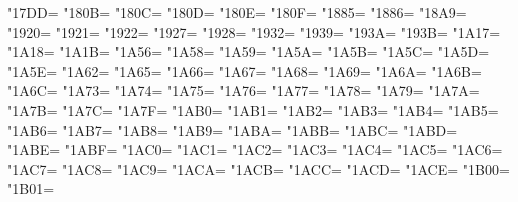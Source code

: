 \XeTeXcharclass"17DD=\KclassNum
\XeTeXcharclass"180B=\KclassNum
\XeTeXcharclass"180C=\KclassNum
\XeTeXcharclass"180D=\KclassNum
\XeTeXcharclass"180E=\KclassNum
\XeTeXcharclass"180F=\KclassNum
\XeTeXcharclass"1885=\KclassNum
\XeTeXcharclass"1886=\KclassNum
\XeTeXcharclass"18A9=\KclassNum
\XeTeXcharclass"1920=\KclassNum
\XeTeXcharclass"1921=\KclassNum
\XeTeXcharclass"1922=\KclassNum
\XeTeXcharclass"1927=\KclassNum
\XeTeXcharclass"1928=\KclassNum
\XeTeXcharclass"1932=\KclassNum
\XeTeXcharclass"1939=\KclassNum
\XeTeXcharclass"193A=\KclassNum
\XeTeXcharclass"193B=\KclassNum
\XeTeXcharclass"1A17=\KclassNum
\XeTeXcharclass"1A18=\KclassNum
\XeTeXcharclass"1A1B=\KclassNum
\XeTeXcharclass"1A56=\KclassNum
\XeTeXcharclass"1A58=\KclassNum
\XeTeXcharclass"1A59=\KclassNum
\XeTeXcharclass"1A5A=\KclassNum
\XeTeXcharclass"1A5B=\KclassNum
\XeTeXcharclass"1A5C=\KclassNum
\XeTeXcharclass"1A5D=\KclassNum
\XeTeXcharclass"1A5E=\KclassNum
\XeTeXcharclass"1A62=\KclassNum
\XeTeXcharclass"1A65=\KclassNum
\XeTeXcharclass"1A66=\KclassNum
\XeTeXcharclass"1A67=\KclassNum
\XeTeXcharclass"1A68=\KclassNum
\XeTeXcharclass"1A69=\KclassNum
\XeTeXcharclass"1A6A=\KclassNum
\XeTeXcharclass"1A6B=\KclassNum
\XeTeXcharclass"1A6C=\KclassNum
\XeTeXcharclass"1A73=\KclassNum
\XeTeXcharclass"1A74=\KclassNum
\XeTeXcharclass"1A75=\KclassNum
\XeTeXcharclass"1A76=\KclassNum
\XeTeXcharclass"1A77=\KclassNum
\XeTeXcharclass"1A78=\KclassNum
\XeTeXcharclass"1A79=\KclassNum
\XeTeXcharclass"1A7A=\KclassNum
\XeTeXcharclass"1A7B=\KclassNum
\XeTeXcharclass"1A7C=\KclassNum
\XeTeXcharclass"1A7F=\KclassNum
\XeTeXcharclass"1AB0=\KclassNum
\XeTeXcharclass"1AB1=\KclassNum
\XeTeXcharclass"1AB2=\KclassNum
\XeTeXcharclass"1AB3=\KclassNum
\XeTeXcharclass"1AB4=\KclassNum
\XeTeXcharclass"1AB5=\KclassNum
\XeTeXcharclass"1AB6=\KclassNum
\XeTeXcharclass"1AB7=\KclassNum
\XeTeXcharclass"1AB8=\KclassNum
\XeTeXcharclass"1AB9=\KclassNum
\XeTeXcharclass"1ABA=\KclassNum
\XeTeXcharclass"1ABB=\KclassNum
\XeTeXcharclass"1ABC=\KclassNum
\XeTeXcharclass"1ABD=\KclassNum
\XeTeXcharclass"1ABE=\KclassNum
\XeTeXcharclass"1ABF=\KclassNum
\XeTeXcharclass"1AC0=\KclassNum
\XeTeXcharclass"1AC1=\KclassNum
\XeTeXcharclass"1AC2=\KclassNum
\XeTeXcharclass"1AC3=\KclassNum
\XeTeXcharclass"1AC4=\KclassNum
\XeTeXcharclass"1AC5=\KclassNum
\XeTeXcharclass"1AC6=\KclassNum
\XeTeXcharclass"1AC7=\KclassNum
\XeTeXcharclass"1AC8=\KclassNum
\XeTeXcharclass"1AC9=\KclassNum
\XeTeXcharclass"1ACA=\KclassNum
\XeTeXcharclass"1ACB=\KclassNum
\XeTeXcharclass"1ACC=\KclassNum
\XeTeXcharclass"1ACD=\KclassNum
\XeTeXcharclass"1ACE=\KclassNum
\XeTeXcharclass"1B00=\KclassNum
\XeTeXcharclass"1B01=\KclassNum
